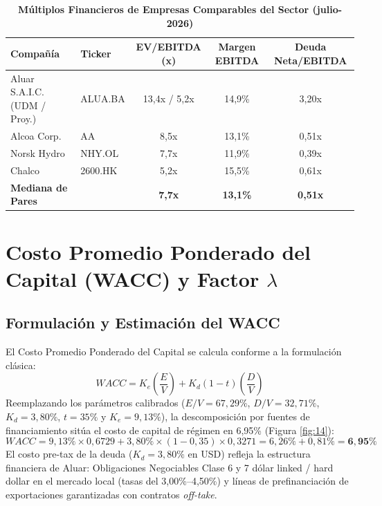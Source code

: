 \documentclass[11pt,a4paper]{article}
\begin{document}
\begin{table}[H]
\centering
\caption{\textbf{Múltiplos Financieros de Empresas Comparables del Sector (julio-2026)}}
\small
\begin{tabular}{llccc}
\toprule
\textbf{Compañía} & \textbf{Ticker} & \textbf{EV/EBITDA (x)} & \textbf{Margen EBITDA} & \textbf{Deuda Neta/EBITDA} \\
\midrule
Aluar S.A.I.C. (UDM / Proy.) & ALUA.BA & 13,4x / 5,2x & 14,9\% & 3,20x \\
Alcoa Corp. & AA & 8,5x & 13,1\% & 0,51x \\
Norsk Hydro & NHY.OL & 7,7x & 11,9\% & 0,39x \\
Chalco & 2600.HK & 5,2x & 15,5\% & 0,61x \\
\midrule
\textbf{Mediana de Pares} & & \textbf{7,7x} & \textbf{13,1\%} & \textbf{0,51x} \\
\bottomrule
\end{tabular}
\end{table}

\section{Costo Promedio Ponderado del Capital (WACC) y Factor \texorpdfstring{$\lambda$}{lambda}}

\subsection{Formulación y Estimación del WACC}
El Costo Promedio Ponderado del Capital se calcula conforme a la formulación clásica:
\begin{equation}
    WACC = K_e \left(\frac{E}{V}\right) + K_d (1 - t) \left(\frac{D}{V}\right)
\end{equation}
Reemplazando los parámetros calibrados ($E/V = 67,29\%$, $D/V = 32,71\%$, $K_d = 3,80\%$, $t = 35\%$ y $K_e = 9,13\%$), la descomposición por fuentes de financiamiento sitúa el costo de capital de régimen en 6,95\% (Figura \ref{fig:14}):
\begin{equation}
    WACC = 9,13\% \times 0,6729 + 3,80\% \times (1 - 0,35) \times 0,3271 = 6,26\% + 0,81\% = \mathbf{6,95\%}
\end{equation}
El costo pre-tax de la deuda ($K_d = 3,80\%$ en USD) refleja la estructura financiera de Aluar: Obligaciones Negociables Clase 6 y 7 dólar linked / hard dollar en el mercado local (tasas del 3,00\%–4,50\%) y líneas de prefinanciación de exportaciones garantizadas con contratos \textit{off-take}.
\end{document}
